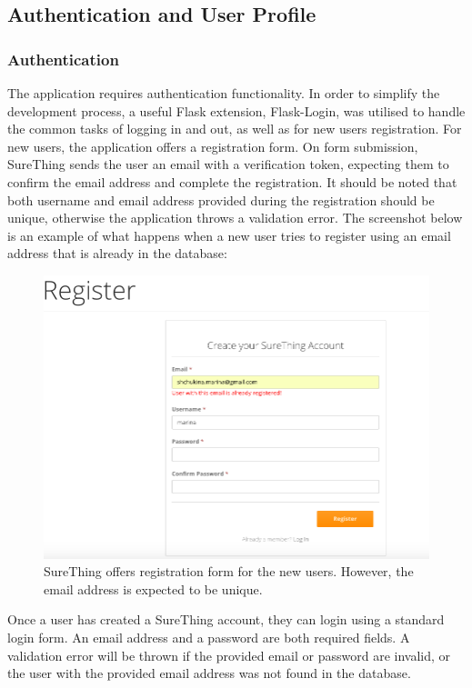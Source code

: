 \subsection{Authentication and User Profile}

\subsubsection*{Authentication}
The application requires authentication functionality. In order to simplify the development process, a useful Flask extension, Flask-Login, was utilised to handle the common tasks of logging in and out, as well as for new users registration. For new users, the application offers a registration form. On form submission, SureThing sends the user an email with a verification token, expecting them to confirm the email address and complete the registration. It should be noted that both username and email address provided during the registration should be unique, otherwise the application throws a validation error. The screenshot below is an example of what happens when a new user tries to register using an email address that is already in the database:

\begin{figure}[H]
	\begin{center}
		\includegraphics[width=.90\textwidth]{impl/images/registrationFormError}
		\caption{SureThing offers registration form for the new users. However, the email address is expected to be unique.} \label{fig:registrationformerror}
	\end{center}
\end{figure}

Once a user has created a SureThing account, they can login using a standard login form.  An email address and a password are both required fields. A validation error will be thrown if the provided email or password are invalid, or the user with the provided email address was not found in the database.

